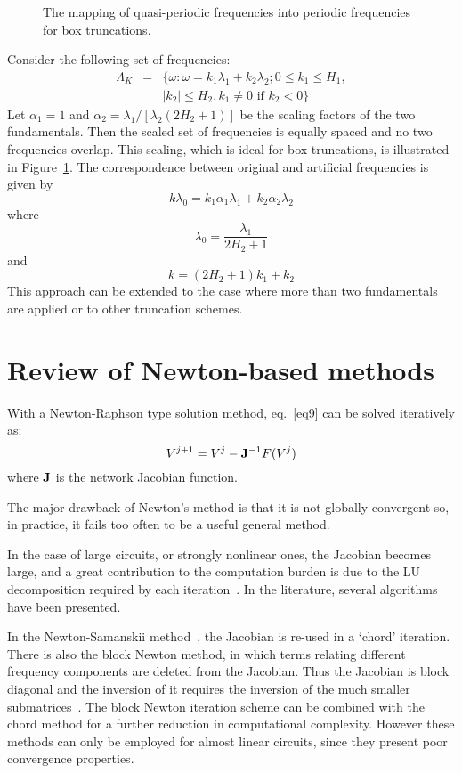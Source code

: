 \begin{figure}[htpb]
\centerline{\epsfxsize=2.5in {}}
\caption{The mapping of quasi-periodic frequencies into periodic
frequencies for box truncations.} \label{art_map}
\end{figure}
%
Consider the following set of frequencies:
\[
  \begin{array}{ccl}
  \Lambda_K  & = & \{\omega:\omega = k_1 \lambda_1 + k_2 \lambda_2; 
              0 \leq k_1 \leq H_1, \\
             &   & |k_2| \leq H_2, k_1 \neq 0 \mbox{~if~} k_2 < 0\}
  \end{array}
\]
Let $\alpha_1 = 1$ and $\alpha_2 = \lambda_1 /[\lambda_2(2H_2+1)]$ be
the scaling factors of the two fundamentals. Then the scaled set of
frequencies is equally spaced and no two frequencies overlap. This
scaling, which is ideal for box truncations, is illustrated in
Figure~\ref{art_map}. The correspondence between original and
artificial frequencies is given by
\[
  k \lambda_0 = k_1 \alpha_1 \lambda_1 +
                k_2 \alpha_2 \lambda_2 
\]
where 
\[
  \lambda_0 = \frac{\lambda_1}{2 H_2 + 1}
\]
and
\[
  k = (2 H_2 + 1 ) k_1 + k_2
\]
This approach can be extended to the case where more than two
fundamentals are applied or to other truncation schemes.

\section{Review of Newton-based methods}

With a Newton-Raphson type solution method, eq.~\ref{eq9} can be
solved iteratively as:
\begin{equation}
  V^{j+1}= V^j - {\bf J}^{-1} F(V^j)  \label{eq735}
\end{equation}
where ${\bf J}$ is the network Jacobian function. 

The major drawback of Newton's method is that it is not globally
convergent so, in practice, it fails too often to be a useful general
method. 

In the case of large circuits, or strongly nonlinear ones, the
Jacobian becomes large, and a great contribution to the computation
burden is due to the LU decomposition required by each
iteration~\cite{damore:94}. In the literature, several algorithms have
been presented.

In the Newton-Samanskii method~\cite{steer1:1996}, the Jacobian is
re-used in a `chord' iteration. There is also the block Newton method,
in which terms relating different frequency components are deleted
from the Jacobian. Thus the Jacobian is block diagonal and the
inversion of it requires the inversion of the much smaller
submatrices~\cite{chang:1990}. The block Newton iteration scheme can
be combined with the chord method for a further reduction in
computational complexity. However these methods can only be employed
for almost linear circuits, since they present poor convergence
properties.

